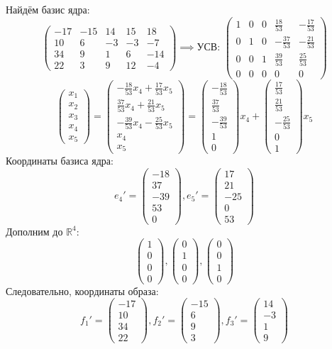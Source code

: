 \documentclass[a4paper]{article}
\newcommand{\mat}[1]{\begin{pmatrix} #1 \end{pmatrix}}
\newcommand{\RR}{\mathbb{R}}
\begin{document}
\begin{enumerate}
    Найдём базис ядра:
    $$\mat{    -17 & -15 & 14 & 15 & 18 \\
    10 & 6 & -3 & -3 & -7 \\
    34 & 9 & 1 & 6 & -14 \\
    22 & 3 & 9 & 12 & -4} \implies \text{УСВ: } \mat{1 & 0 & 0 & \frac{18}{53} & -\frac{17}{53} \\
    0 & 1 & 0 & -\frac{37}{53} & -\frac{21}{53} \\
    0 & 0 & 1 & \frac{39}{53} & \frac{25}{53} \\
    0 & 0 & 0 & 0 & 0}$$
    $$\mat{x_1\\x_2\\x_3\\x_4\\x_5} = 
    \mat{-\frac{18}{53}x_4+\frac{17}{53}x_5\\
    \frac{37}{53}x_4+\frac{21}{53}x_5
    \\-\frac{39}{53}x_4-\frac{25}{53}x_5
    \\x_4\\x_5} = \mat{-\frac{18}{53}\\
    \frac{37}{53}
    \\-\frac{39}{53}
    \\1\\0}x_4 + \mat{\frac{17}{53}\\
    \frac{21}{53}
    \\-\frac{25}{53}
    \\0\\1}x_5$$
    Координаты базиса ядра:
    $$e_4' = \mat{-18\\37\\-39\\53\\0}, e_5' = \mat{17\\21\\-25\\0\\53}$$
    Дополним до $\RR^4$:
    $$\mat{1\\0\\0\\0}, \mat{0\\1\\0\\0}, \mat{0\\0\\1\\0}$$
    Следовательно, координаты образа:
    $$f_1' = \mat{-17\\10\\34\\22}, f_2' = \mat{-15\\6\\9\\3}, f_3'= \mat{14\\-3\\1\\9}$$

\end{enumerate}
\end{document}
